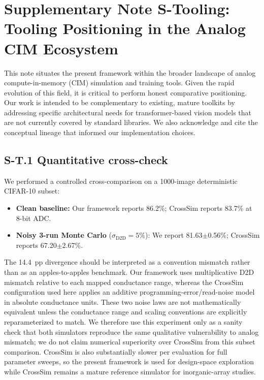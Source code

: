 
\section*{Supplementary Note S-Tooling: Tooling Positioning in the Analog CIM Ecosystem}
\label{supp:tooling}

This note situates the present framework within the broader landscape of analog compute-in-memory (CIM) simulation and training tools. Given the rapid evolution of this field, it is critical to perform honest comparative positioning. Our work is intended to be complementary to existing, mature toolkits by addressing specific architectural needs for transformer-based vision models that are not currently covered by standard libraries. We also acknowledge and cite the conceptual lineage that informed our implementation choices.

\subsection*{S-T.1 Quantitative cross-check}

We performed a controlled cross-comparison on a 1000-image deterministic CIFAR-10 subset:

\begin{itemize}
    \item \textbf{Clean baseline:} Our framework reports 86.2\%; CrossSim reports 83.7\% at 8-bit ADC.
    \item \textbf{Noisy 3-run Monte Carlo} ($\sigma_{\text{D2D}} = 5\%$): We report 81.63$\pm$0.56\%; CrossSim reports 67.20$\pm$2.67\%.
\end{itemize}

The 14.4~pp divergence should be interpreted as a convention mismatch rather than as an apples-to-apples benchmark. Our framework uses multiplicative D2D mismatch relative to each mapped conductance range, whereas the CrossSim configuration used here applies an additive programming-error/read-noise model in absolute conductance units. These two noise laws are not mathematically equivalent unless the conductance range and scaling conventions are explicitly reparameterized to match. We therefore use this experiment only as a sanity check that both simulators reproduce the same qualitative vulnerability to analog mismatch; we do not claim numerical superiority over CrossSim from this subset comparison. CrossSim is also substantially slower per evaluation for full parameter sweeps, so the present framework is used for design-space exploration while CrossSim remains a mature reference simulator for inorganic-array studies.


